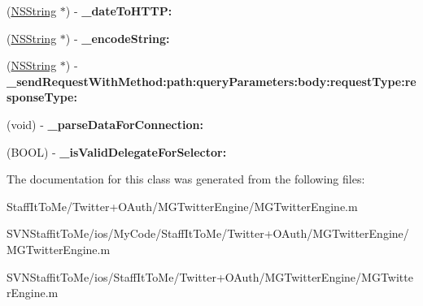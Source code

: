 \begin{DoxyCompactItemize}
\item 
\hypertarget{interface_m_g_twitter_engine_07_private_methods_08_a61eebf5299b79da4d6b9bd411e25c457}{
(\hyperlink{class_n_s_string}{\-N\-S\-String} $\ast$) -\/ {\bfseries \-\_\-date\-To\-H\-T\-T\-P\-:}}
\label{interface_m_g_twitter_engine_07_private_methods_08_a61eebf5299b79da4d6b9bd411e25c457}

\item 
\hypertarget{interface_m_g_twitter_engine_07_private_methods_08_abb4a3f85ee995bc91315d70bd280ae8d}{
(\hyperlink{class_n_s_string}{\-N\-S\-String} $\ast$) -\/ {\bfseries \-\_\-encode\-String\-:}}
\label{interface_m_g_twitter_engine_07_private_methods_08_abb4a3f85ee995bc91315d70bd280ae8d}

\item 
\hypertarget{interface_m_g_twitter_engine_07_private_methods_08_acbe1126f9da524881bfa24ba7d9ff2ea}{
(\hyperlink{class_n_s_string}{\-N\-S\-String} $\ast$) -\/ {\bfseries \-\_\-send\-Request\-With\-Method\-:path\-:query\-Parameters\-:body\-:request\-Type\-:response\-Type\-:}}
\label{interface_m_g_twitter_engine_07_private_methods_08_acbe1126f9da524881bfa24ba7d9ff2ea}

\item 
\hypertarget{interface_m_g_twitter_engine_07_private_methods_08_aa5185d8aad21adead0f3da06a2a654e8}{
(void) -\/ {\bfseries \-\_\-parse\-Data\-For\-Connection\-:}}
\label{interface_m_g_twitter_engine_07_private_methods_08_aa5185d8aad21adead0f3da06a2a654e8}

\item 
\hypertarget{interface_m_g_twitter_engine_07_private_methods_08_a93985b06c163e8d0175708980d4ebb13}{
(\-B\-O\-O\-L) -\/ {\bfseries \-\_\-is\-Valid\-Delegate\-For\-Selector\-:}}
\label{interface_m_g_twitter_engine_07_private_methods_08_a93985b06c163e8d0175708980d4ebb13}

\end{DoxyCompactItemize}


\-The documentation for this class was generated from the following files\-:\begin{DoxyCompactItemize}
\item 
\-Staff\-It\-To\-Me/\-Twitter+\-O\-Auth/\-M\-G\-Twitter\-Engine/\-M\-G\-Twitter\-Engine.\-m\item 
\-S\-V\-N\-Staffit\-To\-Me/ios/\-My\-Code/\-Staff\-It\-To\-Me/\-Twitter+\-O\-Auth/\-M\-G\-Twitter\-Engine/\-M\-G\-Twitter\-Engine.\-m\item 
\-S\-V\-N\-Staffit\-To\-Me/ios/\-Staff\-It\-To\-Me/\-Twitter+\-O\-Auth/\-M\-G\-Twitter\-Engine/\-M\-G\-Twitter\-Engine.\-m\end{DoxyCompactItemize}
